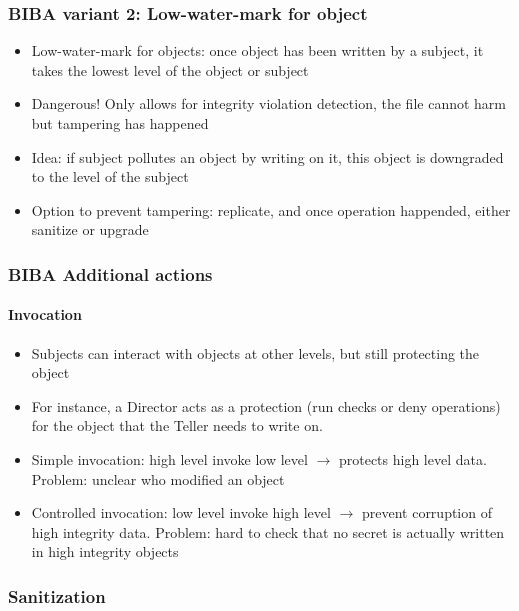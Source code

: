 \documentclass{article}
\newenvironment{myitemize}
{ \begin{itemize}
    \setlength{\itemsep}{005pt}
    \setlength{\parskip}{0pt}
    \setlength{\parsep}{0pt}     }
{ \end{itemize}                  }
\begin{document}
\begin{multicols}{2}
\subsubsection{BIBA variant 2: Low-water-mark for object}

\begin{myitemize}
    \item Low-water-mark for objects: once object has been written by a subject, it takes the lowest level of the object or subject
    \item Dangerous! Only allows for integrity violation detection, the file cannot harm but tampering has happened
    \item Idea: if subject pollutes an object by writing on it, this object is downgraded to the level of the subject
    \item Option to prevent tampering: replicate, and once operation happended, either sanitize or upgrade
\end{myitemize}

\subsubsection{BIBA Additional actions}

\paragraph{Invocation}

\begin{myitemize}
    \item Subjects can interact with objects at other levels, but still protecting the object
    \item For instance, a Director acts as a protection (run checks or deny operations) for the object that the Teller needs to write on. 
    \item Simple invocation: high level invoke low level $\rightarrow$ protects high level data. Problem: unclear who modified an object
    \item Controlled invocation: low level invoke high level $\rightarrow$ prevent corruption of high integrity data. Problem: hard to check that no secret is actually written in high integrity objects
\end{myitemize}

\subsubsection{Sanitization}


\end{multicols}
\end{document}
